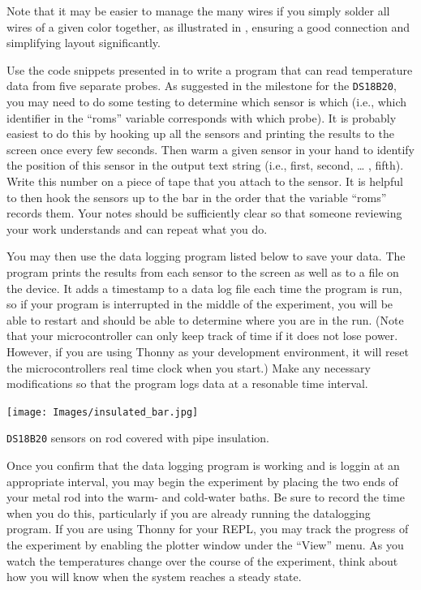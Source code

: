 Note that it may be easier to manage the many wires if you simply solder all wires of a given color together, as illustrated in , ensuring a good connection and simplifying layout significantly.

Use the code snippets presented in  to write a program that can read temperature data from five separate probes. As suggested in the milestone for the \texttt{DS18B20}, you may need to do some testing to determine which sensor is which (i.e., which identifier in the “roms” variable corresponds with which probe).  It is probably easiest to do this by hooking up all the sensors and printing the results to the screen once every few seconds.  Then warm a given sensor in your hand to identify the position of this sensor in the output text string (i.e., first, second, … , fifth).  Write this number on a piece of tape that you attach to the sensor. It is helpful to then hook the sensors up to the bar in the order that the variable “roms” records them. Your notes should be sufficiently clear so that someone reviewing your work understands and can repeat what you do.

You may then use the data logging program listed below to save your data. The program prints the results from each sensor to the screen as well as to a file on the device.  It  adds a timestamp to a data log file each time the program is run, so if your program is interrupted in the middle of the experiment, you will be able to restart and should be able to determine where you are in the run. (Note that your microcontroller can only keep track of time if it does not lose power.  However, if you are using Thonny as your development environment, it will reset the microcontrollers real time clock when you start.)  Make any necessary modifications so that the program logs data at a resonable time interval.

\begin{marginfigure}[]
	\begin{center}
		\texttt{[image: Images/insulated\_bar.jpg]}
		\caption[Insulated Bar for Diffusion Experiment]{\texttt{DS18B20} sensors on rod covered with pipe insulation.}
	\end{center}
\end{marginfigure}

Once you confirm that the data logging program is working and is loggin at an appropriate interval, you may begin the experiment by placing the two ends of your metal rod into the warm- and cold-water baths.  Be sure to record the time when you do this, particularly if you are already running the datalogging program. If you are using Thonny for your REPL, you may track the progress of the experiment by enabling the plotter window under the ``View'' menu. As you watch the temperatures change over the course of the experiment, think about how you will know when the system reaches a steady state.


